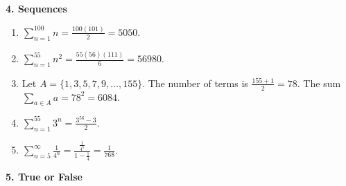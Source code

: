\documentclass[12pt]{article}
\begin{document}
\textbf{4. Sequences}

\begin{enumerate}
\item[ (a) ] $\sum_{n=1}^{100} n = \frac{100(101)}{2} = 5050$.
\item[ (b) ] $\sum_{n=1}^{55} n^2 = \frac{55(56)(111)}{6} = 56980$.
\item[ (c) ] Let $A = \{1,3,5,7,9,\dots,155\}$. The number of terms is $\frac{155+1}{2} = 78$. The sum $\sum_{a \in A} a = 78^2 = 6084$.
\item[ (d) ] $\sum_{n=1}^{55} 3^n = \frac{3^{56}-3}{2}$.
\item[ (e) ] $\sum_{n=5}^{\infty} \frac{1}{4^n} = \frac{\frac{1}{4^5}}{1-\frac{1}{4}} = \frac{1}{768}$.
\end{enumerate}

\textbf{5. True or False}
\end{document}
